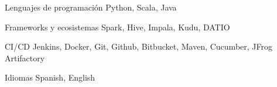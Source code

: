 

\begin{cvskills}

  \cvskill
    {Lenguajes de programación} %
    {Python, Scala, Java} %

  \cvskill
    {Frameworks y ecosistemas} %
    {Spark, Hive, Impala, Kudu, DATIO} %

  \cvskill
    {CI/CD} %
    {Jenkins, Docker, Git, Github, Bitbucket, Maven, Cucumber, JFrog Artifactory} %

  \cvskill
    {Idiomas} %
    {Spanish, English} %

\end{cvskills}
